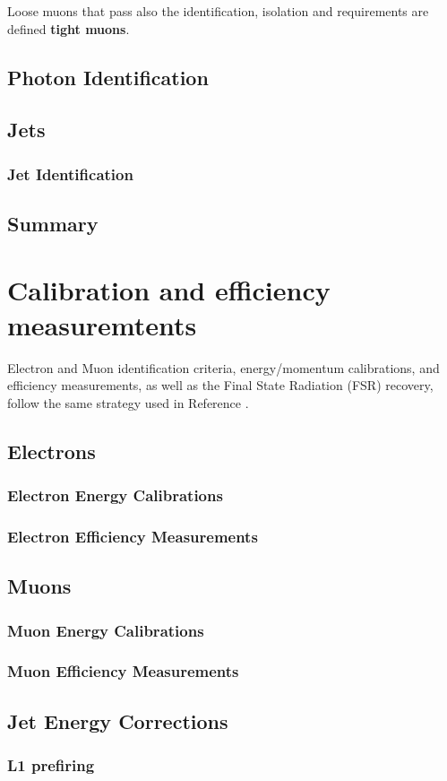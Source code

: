 Loose muons that pass also the identification, isolation and \SIPthreeD requirements are defined \textbf{tight muons}.

\subsection{Photon Identification}
\label{sec:photonID}


\subsection{Jets}
\subsubsection{Jet Identification}


\subsection{Summary}


\section{Calibration and efficiency measuremtents}
Electron and Muon identification criteria, energy/momentum calibrations, and efficiency measurements,
as well as the Final State Radiation (FSR) recovery, follow the same strategy used in Reference \cite{CMS-SMP-20-001}. %

\subsection{Electrons}
\subsubsection{Electron Energy Calibrations}

\subsubsection{Electron Efficiency Measurements}
\label{sec:eleEffMeas}


\subsection{Muons}
\subsubsection{Muon Energy Calibrations}

\subsubsection{Muon Efficiency Measurements}
\label{sec:muonEffMeas}


\subsection{Jet Energy Corrections}


\subsubsection{L1 prefiring}

